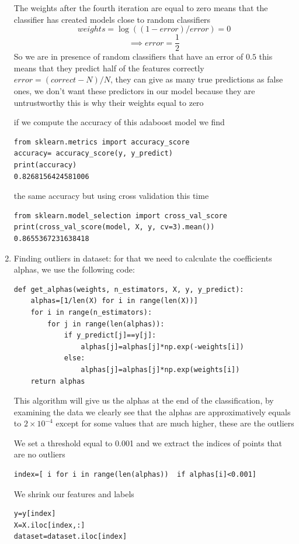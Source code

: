 \documentclass[12pt,a4paper]{report}
\begin{document}
\begin{enumerate}
The weights after the fourth iteration are equal to zero means that the classifier has created models close to random classifiers 
$$ weights= \log((1-error)/error) = 0$$
$$ \implies error= \dfrac{1}{2}$$
So we are in presence of random classifiers that have an error of $0.5$ this means that they predict half of the features correctly $error = (correct - N)/N $, they can give as many true predictions as false ones, we don't want these predictors in our model because they are untrustworthy this is why their weights equal to zero   

if we compute the accuracy of this adaboost model we find 
\begin{verbatim}
from sklearn.metrics import accuracy_score
accuracy= accuracy_score(y, y_predict)
print(accuracy)
0.8268156424581006
\end{verbatim}

the same accuracy but using cross validation this time 
\begin{verbatim}
from sklearn.model_selection import cross_val_score
print(cross_val_score(model, X, y, cv=3).mean()) 
0.8655367231638418	
\end{verbatim}

\item Finding outliers in dataset:
for that we need to calculate the coefficients alphas, we use the following code:
\begin{verbatim}
def get_alphas(weights, n_estimators, X, y, y_predict):
    alphas=[1/len(X) for i in range(len(X))]
    for i in range(n_estimators):
        for j in range(len(alphas)):
            if y_predict[j]==y[j]:
                alphas[j]=alphas[j]*np.exp(-weights[i])
            else:
                alphas[j]=alphas[j]*np.exp(weights[i])
    return alphas
\end{verbatim}

This algorithm will give us the alphas at the end of the classification, by examining the data we clearly see that the alphas 
are approximatively equals to $2\times 10^{-4}$ except for some values that are much higher, these are the outliers 

We set a threshold equal to 0.001 and we extract the indices of points that are no outliers 
\begin{verbatim}
index=[ i for i in range(len(alphas))  if alphas[i]<0.001]
\end{verbatim} 

We shrink our features and labels
\begin{verbatim}
y=y[index]
X=X.iloc[index,:]
dataset=dataset.iloc[index]
\end{verbatim}

\end{enumerate} 
\end{document}
